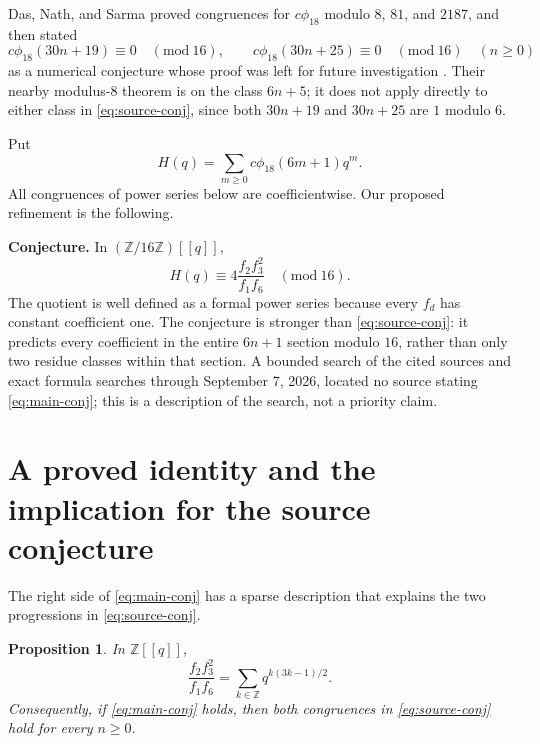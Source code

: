 \documentclass[11pt]{article}
\newtheorem{proposition}{Proposition}
\newcommand{\cphi}{c\phi}
\begin{document}
Das, Nath, and Sarma proved congruences for \(\cphi_{18}\) modulo $8$,
$81$, and $2187$, and then stated
\begin{equation}\label{eq:source-conj}
 \cphi_{18}(30n+19)\equiv0\quad(\mathrm{mod}\ 16),\qquad
 \cphi_{18}(30n+25)\equiv0\quad(\mathrm{mod}\ 16)
 \quad(n\geq0)
\end{equation}
as a numerical conjecture whose proof was left for future investigation
\cite[Conjecture 5.1]{DasNathSarma2026}.  Their nearby modulus-$8$ theorem is
on the class $6n+5$; it does not apply directly to either class in
\eqref{eq:source-conj}, since both $30n+19$ and $30n+25$ are $1$
modulo $6$.

Put
\[
 H(q)=\sum_{m\geq0}\cphi_{18}(6m+1)q^m.
\]
All congruences of power series below are coefficientwise.  Our proposed
refinement is the following.

\medskip
\noindent\textbf{Conjecture.}
In \((\mathbb Z/16\mathbb Z)[[q]]\),
\begin{equation}\label{eq:main-conj}
 H(q)\equiv4\frac{f_2f_3^2}{f_1f_6}\quad(\mathrm{mod}\ 16).
\end{equation}
The quotient is well defined as a formal power series because every $f_d$
has constant coefficient one.  The conjecture is stronger than
\eqref{eq:source-conj}: it predicts every coefficient in the entire
$6n+1$ section modulo $16$, rather than only two residue classes within
that section.  A bounded search of the cited sources and exact formula
searches through September 7, 2026, located no source stating
\eqref{eq:main-conj}; this is a description of the search, not a priority
claim.

\section{A proved identity and the implication for the source conjecture}

The right side of \eqref{eq:main-conj} has a sparse description that explains
the two progressions in \eqref{eq:source-conj}.

\begin{proposition}\label{prop:theta}
In \(\mathbb Z[[q]]\),
\begin{equation}\label{eq:theta}
 \frac{f_2f_3^2}{f_1f_6}
 =\sum_{k\in\mathbb Z}q^{k(3k-1)/2}.
\end{equation}
Consequently, if \eqref{eq:main-conj} holds, then both congruences in
\eqref{eq:source-conj} hold for every \(n\geq0\).
\end{proposition}
\end{document}
